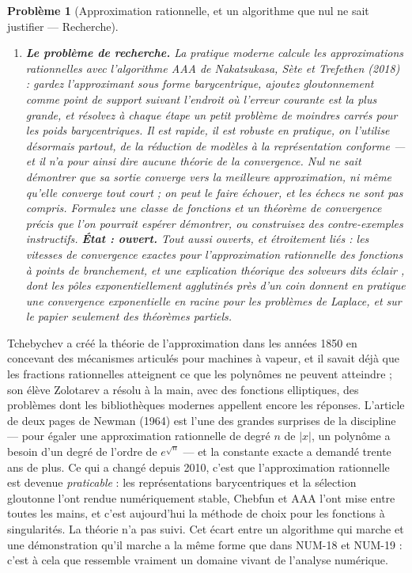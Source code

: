 \documentclass[11pt]{article}
\newtheorem{problem}{Problème}
\begin{document}
\begin{problem}[{Approximation rationnelle, et un algorithme que nul ne sait justifier --- Recherche}]
\begin{enumerate}
\item[(d)] \textbf{Le problème de recherche.} La pratique moderne calcule les approximations rationnelles avec l'algorithme AAA de Nakatsukasa, Sète et Trefethen (2018) : gardez l'approximant sous forme barycentrique, ajoutez gloutonnement comme point de support suivant l'endroit où l'erreur courante est la plus grande, et résolvez à chaque étape un petit problème de moindres carrés pour les poids barycentriques. Il est rapide, il est robuste en pratique, on l'utilise désormais partout, de la réduction de modèles à la représentation conforme --- et il n'a pour ainsi dire aucune théorie de la convergence. Nul ne sait démontrer que sa sortie converge vers la meilleure approximation, ni même qu'elle converge tout court ; on peut le faire échouer, et les échecs ne sont pas compris. Formulez une classe de fonctions et un théorème de convergence précis que l'on pourrait espérer démontrer, ou construisez des contre-exemples instructifs. \textbf{État : ouvert.} Tout aussi ouverts, et étroitement liés : les vitesses de convergence exactes pour l'approximation rationnelle des fonctions à points de branchement, et une explication théorique des solveurs dits \og{} éclair \fg{}, dont les pôles exponentiellement agglutinés près d'un coin donnent en pratique une convergence exponentielle en racine pour les problèmes de Laplace, et sur le papier seulement des théorèmes partiels.
\end{enumerate}

\end{problem}

\noindent Tchebychev a créé la théorie de l'approximation dans les années 1850 en concevant des mécanismes articulés pour machines à vapeur, et il savait déjà que les fractions rationnelles atteignent ce que les polynômes ne peuvent atteindre ; son élève Zolotarev a résolu à la main, avec des fonctions elliptiques, des problèmes dont les bibliothèques modernes appellent encore les réponses. L'article de deux pages de Newman (1964) est l'une des grandes surprises de la discipline --- pour égaler une approximation rationnelle de degré $n$ de $|x|$, un polynôme a besoin d'un degré de l'ordre de $e^{\sqrt{n}}$ --- et la constante exacte a demandé trente ans de plus. Ce qui a changé depuis 2010, c'est que l'approximation rationnelle est devenue \textit{praticable} : les représentations barycentriques et la sélection gloutonne l'ont rendue numériquement stable, Chebfun et AAA l'ont mise entre toutes les mains, et c'est aujourd'hui la méthode de choix pour les fonctions à singularités. La théorie n'a pas suivi. Cet écart entre un algorithme qui marche et une démonstration qu'il marche a la même forme que dans NUM-18 et NUM-19 : c'est à cela que ressemble vraiment un domaine vivant de l'analyse numérique.
\end{document}
